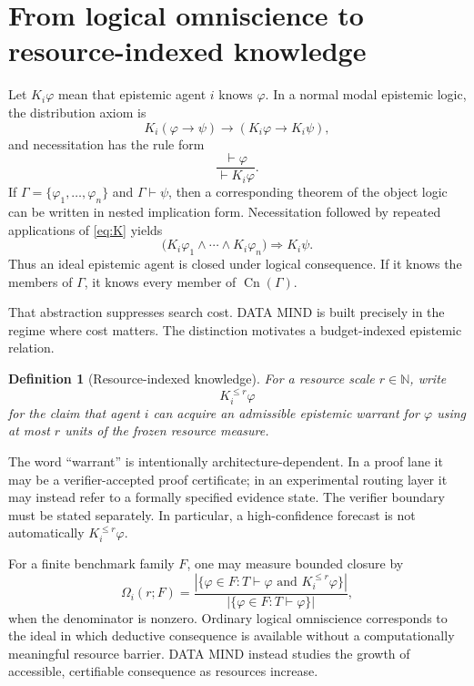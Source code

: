 \documentclass[11pt]{article}
\newtheorem{definition}{Definition}[section]
\newcommand{\Cn}{\operatorname{Cn}}
\begin{document}
\section{From logical omniscience to resource-indexed knowledge}

Let $K_i\varphi$ mean that epistemic agent $i$ knows $\varphi$. In a normal modal epistemic logic, the distribution axiom is
\begin{equation}
K_i(\varphi\rightarrow\psi)\rightarrow(K_i\varphi\rightarrow K_i\psi),
\label{eq:K}
\end{equation}
and necessitation has the rule form
\begin{equation}
\frac{\vdash\varphi}{\vdash K_i\varphi}.
\label{eq:nec}
\end{equation}
If $\Gamma=\{\varphi_1,\ldots,\varphi_n\}$ and $\Gamma\vdash\psi$, then a corresponding theorem of the object logic can be written in nested implication form. Necessitation followed by repeated applications of \eqref{eq:K} yields
\begin{equation}
\bigl(K_i\varphi_1\wedge\cdots\wedge K_i\varphi_n\bigr)\Longrightarrow K_i\psi.
\end{equation}
Thus an ideal epistemic agent is closed under logical consequence. If it knows the members of $\Gamma$, it knows every member of $\Cn(\Gamma)$.

That abstraction suppresses search cost. DATA MIND is built precisely in the regime where cost matters. The distinction motivates a budget-indexed epistemic relation.

\begin{definition}[Resource-indexed knowledge]
For a resource scale $r\in\mathbb N$, write
\begin{equation}
K_i^{\le r}\varphi
\end{equation}
for the claim that agent $i$ can acquire an admissible epistemic warrant for $\varphi$ using at most $r$ units of the frozen resource measure.
\end{definition}

The word ``warrant'' is intentionally architecture-dependent. In a proof lane it may be a verifier-accepted proof certificate; in an experimental routing layer it may instead refer to a formally specified evidence state. The verifier boundary must be stated separately. In particular, a high-confidence forecast is not automatically $K_i^{\le r}\varphi$.

For a finite benchmark family $F$, one may measure bounded closure by
\begin{equation}
\Omega_i(r;F)=
\frac{
\left|\{\varphi\in F:T\vdash\varphi\text{ and }K_i^{\le r}\varphi\}\right|
}{
\left|\{\varphi\in F:T\vdash\varphi\}\right|
},
\end{equation}
when the denominator is nonzero. Ordinary logical omniscience corresponds to the ideal in which deductive consequence is available without a computationally meaningful resource barrier. DATA MIND instead studies the growth of accessible, certifiable consequence as resources increase.
\end{document}
